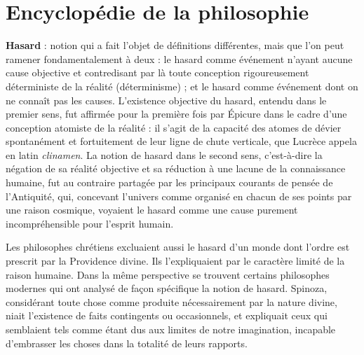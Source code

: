 
\section{Encyclopédie de la philosophie}
%
{\bf Hasard} : notion qui a fait l’objet de définitions différentes, mais que l’on peut ramener fondamentalement à deux : le hasard
comme événement n’ayant aucune cause
objective et contredisant par là toute
conception rigoureusement déterministe
de la réalité (déterminisme) ; et le hasard
comme événement dont on ne connaît pas
les causes. L’existence objective du
hasard, entendu dans le premier sens, fut
affirmée pour la première fois par Épicure dans le cadre d’une conception atomiste de la réalité : 
il s’agit de la capacité
des atomes de dévier spontanément et
fortuitement de leur ligne de chute verticale, que Lucrèce appela en latin {\it clinamen}. La notion de hasard dans le second
sens, c’est-à-dire la négation de sa réalité
objective et sa réduction à une lacune de
la connaissance humaine, fut au contraire
partagée par les principaux courants de
pensée de l'Antiquité, qui, concevant
l’univers comme organisé en chacun de
ses points par une raison cosmique,
voyaient le hasard comme une cause
purement incompréhensible pour l'esprit
humain.

Les philosophes chrétiens excluaient
aussi le hasard d’un monde dont l’ordre
est prescrit par la Providence divine. Ils
l’expliquaient par le caractère limité de la
raison humaine. Dans la même perspective se trouvent certains philosophes
modernes qui ont analysé de façon spécifique la notion de hasard. Spinoza, considérant toute chose comme produite
nécessairement par la nature divine, niait
l'existence de faits contingents ou occasionnels, et expliquait ceux qui semblaient
tels comme étant dus aux limites de notre
imagination, incapable d’embrasser les
choses dans la totalité de leurs rapports.

